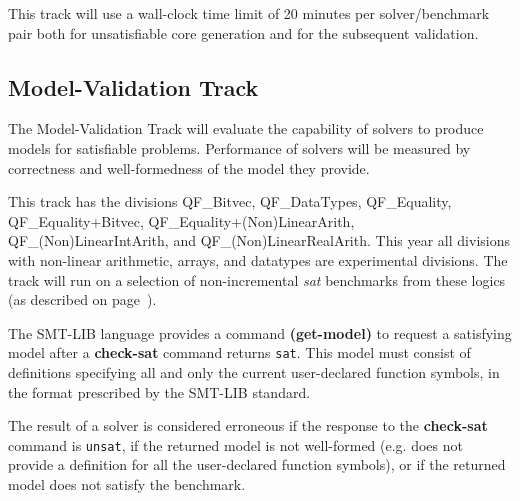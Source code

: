\documentclass[12pt]{article}
\newcommand{\akey}[1]{\textbf{#1}\xspace}
\newcommand{\mvaltrack}{Model-Validation Track\xspace}
\begin{document}
  This track will use a wall-clock time limit of
20 minutes per solver/benchmark pair both for unsatisfiable core generation and
for the subsequent validation.

\subsection{\mvaltrack}
\label{sec:exec:model}
The \mvaltrack will evaluate the capability of solvers to produce models for
satisfiable problems.  Performance of solvers will be measured by correctness
and well-formedness of the model they provide.

  This track has the divisions QF\_Bitvec,
QF\_DataTypes, QF\_Equality,
QF\_Equality+Bitvec,
QF\_Equality+(Non)LinearArith,
QF\_(Non)LinearIntArith, and QF\_(Non)\-LinearRealArith.
This year all divisions with non-linear arithmetic, arrays, and datatypes
are experimental divisions.
%
The track will run on a
selection of non-incremental \emph{sat} benchmarks from these
logics (as described on page~\pageref{benchmark-selection}).

The SMT-LIB language provides a command \akey{(get-model)} to request a
satisfying model after a \akey{check-sat} command returns \texttt{sat}.  This
model must consist of definitions specifying all and only the current
user-declared function symbols, in the format prescribed by the SMT-LIB
standard.

The result of a solver is considered erroneous if the response to the
\akey{check-sat} command is \texttt{unsat}, if the returned model is not
well-formed (e.g. does not provide a definition for all the user-declared
function symbols), or if the returned model does not satisfy the benchmark.
\end{document}
